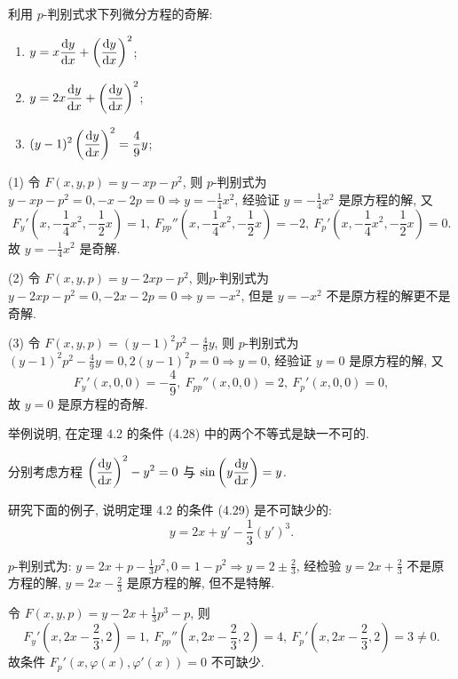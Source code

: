 \begin{exercise}
  利用 $p$-判别式求下列微分方程的奇解:
  \begin{enumerate}[(1)]
  \item $\displaystyle y=x\frac{\mathop{}\!\mathrm{d} y}{\mathop{}\!\mathrm{d} x}+\left(\frac{\mathop{}\!\mathrm{d} y}{\mathop{}\!\mathrm{d} x}\right)^2$;
  \item $\displaystyle y=2x\frac{\mathop{}\!\mathrm{d} y}{\mathop{}\!\mathrm{d} x}+\left(\frac{\mathop{}\!\mathrm{d} y}{\mathop{}\!\mathrm{d} x}\right)^2$;
  \item $\displaystyle (y-1)^2\left(\frac{\mathop{}\!\mathrm{d} y}{\mathop{}\!\mathrm{d} x}\right)^2=\frac{4}{9}y$;
  \end{enumerate}
\end{exercise}

\begin{solve} 
  (1) 令 $F(x,y,p)=y-xp-p^2$, 则 $p$-判别式为
  $y-xp-p^2=0,-x-2p=0\Rightarrow y=-\frac{1}{4}x^2$, 经验证 $y=-\frac{1}{4}x^2$ 是原方程的解, 又
  \[F_y'\left(x,-\frac{1}{4}x^2,-\frac{1}{2}x\right)=1,\:
    F_{pp}''\left(x,-\frac{1}{4}x^2,-\frac{1}{2}x\right)=-2,\:
    F_p'\left(x,-\frac{1}{4}x^2,-\frac{1}{2}x\right)=0.\]
  故 $y=-\frac{1}{4}x^2$ 是奇解.

  (2) 令 $F(x,y,p)=y-2xp-p^2$, 则$p$-判别式为$y-2xp-p^2=0,-2x-2p=0\Rightarrow y=-x^2$,
  但是 $y=-x^2$ 不是原方程的解更不是奇解.

  (3) 令 $F(x,y,p)=(y-1)^2p^2-\frac{4}{9}y$, 
  则 $p$-判别式为 $(y-1)^2p^2-\frac{4}{9}y=0,2(y-1)^2p=0\Rightarrow y=0$, 
  经验证 $y=0$ 是原方程的解, 又
  \[F_y'(x,0,0)=-\frac{4}{9},\: F_{pp}''(x,0,0)=2,\: F_p'(x,0,0)=0,\]
  故 $y=0$ 是原方程的奇解.
\end{solve}



\begin{exercise}
  举例说明, 在定理 4.2 的条件 (4.28) 中的两个不等式是缺一不可的.
\end{exercise}

\begin{solve}  
  分别考虑方程 $\displaystyle\left(\frac{\mathop{}\!\mathrm{d} y}{\mathop{}\!\mathrm{d} x}\right)^2-y^2=0$
  与 $\displaystyle\sin\left(y\frac{\mathop{}\!\mathrm{d} y}{\mathop{}\!\mathrm{d} x}\right)=y$.
\end{solve}



\begin{exercise}
  研究下面的例子, 说明定理 4.2 的条件 (4.29) 是不可缺少的:
  \[y=2x+y'-\frac{1}{3}(y')^3.\]
\end{exercise}

\begin{solve} 
  $p$-判别式为: $y=2x+p-\frac{1}{3}p^2,0=1-p^2\Rightarrow y=2\pm\frac{2}{3}$, 
  经检验 $y=2x+\frac{2}{3}$ 不是原方程的解, $y=2x-\frac{2}{3}$ 是原方程的解, 但不是特解.

  令 $F(x,y,p)=y-2x+\frac{1}{3}p^3-p$, 则
  \[F_y'\left(x,2x-\frac{2}{3},2\right)=1,\:
    F_{pp}''\left(x,2x-\frac{2}{3},2\right)=4,\:
    F_p'\left(x,2x-\frac{2}{3},2\right)=3\neq 0.\]
  故条件 $F_p'(x,\varphi(x),\varphi'(x))=0$ 不可缺少.
\end{solve}



